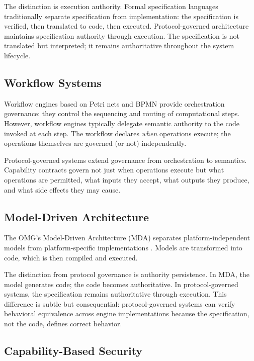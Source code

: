 \documentclass[11pt,a4paper]{article}
\begin{document}
The distinction is execution authority. Formal specification languages traditionally separate specification from implementation: the specification is verified, then translated to code, then executed. Protocol-governed architecture maintains specification authority through execution. The specification is not translated but interpreted; it remains authoritative throughout the system lifecycle.

\subsection{Workflow Systems}

Workflow engines based on Petri nets \citep{vanderaalst2003workflow} and BPMN \citep{omg2011bpmn} provide orchestration governance: they control the sequencing and routing of computational steps. However, workflow engines typically delegate semantic authority to the code invoked at each step. The workflow declares \emph{when} operations execute; the operations themselves are governed (or not) independently.

Protocol-governed systems extend governance from orchestration to semantics. Capability contracts govern not just when operations execute but what operations are permitted, what inputs they accept, what outputs they produce, and what side effects they may cause.

\subsection{Model-Driven Architecture}

The OMG's Model-Driven Architecture (MDA) separates platform-independent models from platform-specific implementations \citep{omg2014mda}. Models are transformed into code, which is then compiled and executed.

The distinction from protocol governance is authority persistence. In MDA, the model generates code; the code becomes authoritative. In protocol-governed systems, the specification remains authoritative through execution. This difference is subtle but consequential: protocol-governed systems can verify behavioral equivalence across engine implementations because the specification, not the code, defines correct behavior.

\subsection{Capability-Based Security}
\end{document}
